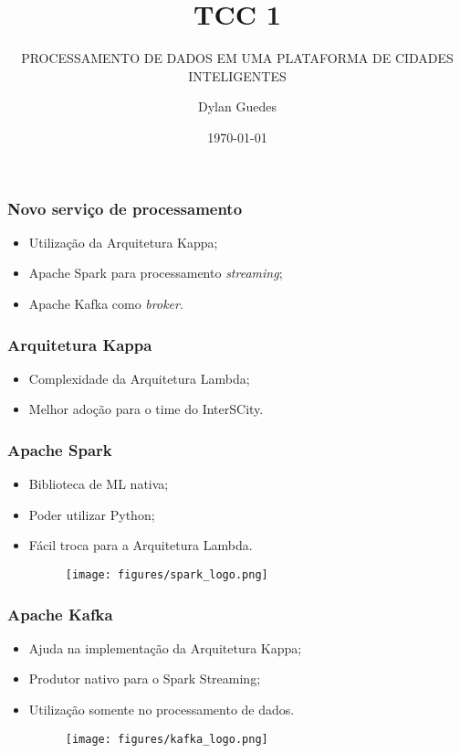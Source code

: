 \documentclass{beamer}
\title{TCC 1}
\subtitle{PROCESSAMENTO DE DADOS EM UMA PLATAFORMA DE CIDADES INTELIGENTES}
\author{Dylan Guedes}
\institute{UnB Gama}
\date{\today}
\begin{document}
  
  
  
  
  
  
  
  
  
  
  

  \begin{frame}
      \frametitle{Novo serviço de processamento}
      \begin{itemize}
          \item Utilização da Arquitetura Kappa;
          \item Apache Spark para processamento \textit{streaming};
          \item Apache Kafka como \textit{broker}.
      \end{itemize}
  \end{frame}

  \begin{frame}
      \frametitle{Arquitetura Kappa}
      \begin{itemize}
          \item Complexidade da Arquitetura Lambda;
          \item Melhor adoção para o time do InterSCity.
      \end{itemize}
  \end{frame}

  \begin{frame}
      \frametitle{Apache Spark}
      \begin{itemize}
          \item Biblioteca de ML nativa;
          \item Poder utilizar Python;
          \item Fácil troca para a Arquitetura Lambda.
              \begin{figure}
                  \texttt{[image: figures/spark\_logo.png]}
              \end{figure}
      \end{itemize}
  \end{frame}

  \begin{frame}
      \frametitle{Apache Kafka}
      \begin{itemize}
          \item Ajuda na implementação da Arquitetura Kappa;
          \item Produtor nativo para o Spark Streaming;
          \item Utilização somente no processamento de dados.
              \begin{figure}
                  \texttt{[image: figures/kafka\_logo.png]}
              \end{figure}
      \end{itemize}
  \end{frame}
\end{document}
